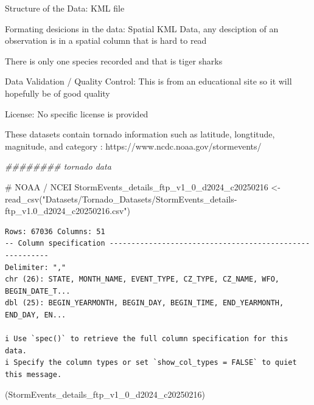 \documentclass[
  letterpaper,
  DIV=11,
  numbers=noendperiod]{scrreprt}
\newenvironment{Shaded}{\begin{snugshade}}{\end{snugshade}}
\newcommand{\CommentTok}[1]{\textcolor[rgb]{0.37,0.37,0.37}{#1}}
\newcommand{\DocumentationTok}[1]{\textcolor[rgb]{0.37,0.37,0.37}{\textit{#1}}}
\newcommand{\FunctionTok}[1]{\textcolor[rgb]{0.28,0.35,0.67}{#1}}
\newcommand{\NormalTok}[1]{\textcolor[rgb]{0.00,0.23,0.31}{#1}}
\newcommand{\OtherTok}[1]{\textcolor[rgb]{0.00,0.23,0.31}{#1}}
\newcommand{\StringTok}[1]{\textcolor[rgb]{0.13,0.47,0.30}{#1}}
\begin{document}
Structure of the Data: KML file

Formating desicions in the data: Spatial KML Data, any desciption of an
observation is in a spatial column that is hard to read

There is only one species recorded and that is tiger sharks

Data Validation / Quality Control: This is from an educational site so
it will hopefully be of good quality

License: No specific license is provided

These datasets contain tornado information such as latitude, longtitude,
magnitude, and category : https://www.ncdc.noaa.gov/stormevents/

\begin{Shaded}
\begin{Highlighting}[]
\DocumentationTok{\#\#\#\#\#\#\#\# tornado data}

\CommentTok{\# NOAA / NCEI}
\NormalTok{StormEvents\_details\_ftp\_v1\_0\_d2024\_c20250216 }\OtherTok{\textless{}{-}} \FunctionTok{read\_csv}\NormalTok{(}\StringTok{"Datasets/Tornado\_Datasets/StormEvents\_details{-}ftp\_v1.0\_d2024\_c20250216.csv"}\NormalTok{)}
\end{Highlighting}
\end{Shaded}

\begin{verbatim}
Rows: 67036 Columns: 51
-- Column specification --------------------------------------------------------
Delimiter: ","
chr (26): STATE, MONTH_NAME, EVENT_TYPE, CZ_TYPE, CZ_NAME, WFO, BEGIN_DATE_T...
dbl (25): BEGIN_YEARMONTH, BEGIN_DAY, BEGIN_TIME, END_YEARMONTH, END_DAY, EN...

i Use `spec()` to retrieve the full column specification for this data.
i Specify the column types or set `show_col_types = FALSE` to quiet this message.
\end{verbatim}

\begin{Shaded}
\begin{Highlighting}[]
\NormalTok{(StormEvents\_details\_ftp\_v1\_0\_d2024\_c20250216)}
\end{Highlighting}
\end{Shaded}
\end{document}
